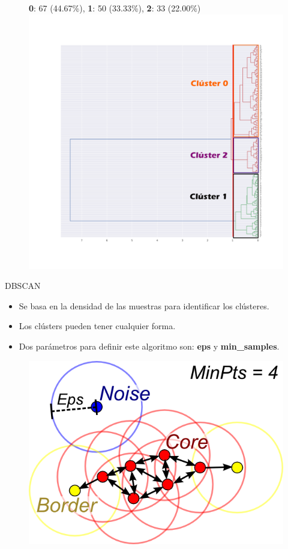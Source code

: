 \documentclass[spanish]{beamer}
\begin{document}
\begin{frame}
\begin{figure}[h]
\centering
\textbf{0}: 67 (44.67\%), \textbf{1}: 50 (33.33\%), \textbf{2}: 33 (22.00\%)
\includegraphics[scale=0.23]{dani/dendrogramcolor.png}
\end{figure}
\end{frame}

\begin{frame}{DBSCAN}
\begin{itemize}
\item Se basa en la densidad de las muestras para identificar los clústeres.
\item Los clústers pueden tener cualquier forma.
\item Dos parámetros para definir este algoritmo son: \textbf{eps} y \textbf{min\_samples}.
\end{itemize}
\begin{figure}[h]
\centering
\includegraphics[scale=1.2]{dani/DBSCAN.png}
\end{figure}
\end{frame}
\end{document}
